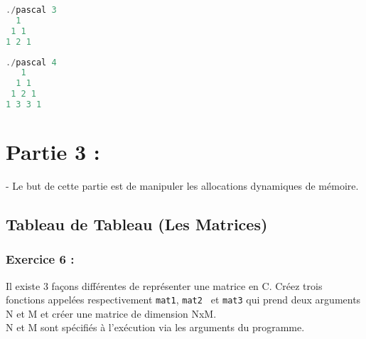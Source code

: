 \documentclass[a4paper]{article}
\begin{document}
	\begin{lstlisting}[language=C]
./pascal 3
  1
 1 1
1 2 1
	\end{lstlisting}
	\begin{lstlisting}[language=C]	
./pascal 4
   1
  1 1
 1 2 1
1 3 3 1
	\end{lstlisting}

	\section*{Partie 3 : }
	- Le but de cette partie est de manipuler les allocations dynamiques de mémoire.
	\subsection*{Tableau de Tableau (Les Matrices)}
	\subsubsection*{Exercice 6 : }
	Il existe 3 façons différentes de représenter une matrice en C. Créez trois fonctions appelées respectivement \texttt{mat1}, \texttt{mat2 } et \texttt{mat3} qui prend deux arguments N et M et créer une matrice de dimension NxM. \\
	N et M sont spécifiés à l'exécution via les arguments du programme.
\end{document}
